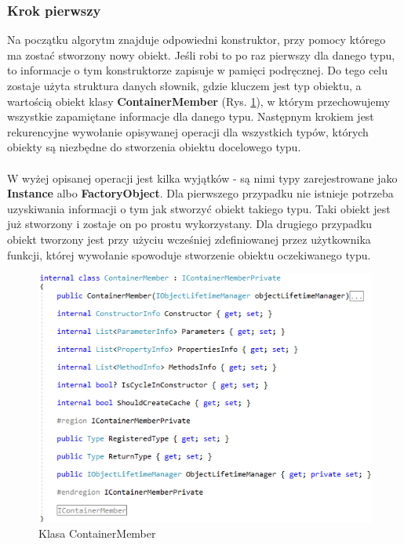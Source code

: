 \documentclass[12pt]{article}
\begin{document}
\subsubsection{Krok pierwszy}
Na początku algorytm znajduje odpowiedni konstruktor, przy pomocy którego ma zostać stworzony nowy obiekt. Jeśli robi to po raz pierwszy dla danego typu, to informacje o tym konstruktorze zapisuje w pamięci podręcznej. Do tego celu zostaje użyta struktura danych słownik, gdzie kluczem jest typ obiektu, a wartością obiekt klasy \textbf{ContainerMember} (Rys. \ref{fig:ContainerMember}), w którym przechowujemy wszystkie zapamiętane informacje dla danego typu. Następnym krokiem jest rekurencyjne wywołanie opisywanej operacji dla wszystkich typów, których obiekty są niezbędne do stworzenia obiektu docelowego typu.\\
\\
W wyżej opisanej operacji jest kilka wyjątków - są nimi typy zarejestrowane jako \textbf{Instance} albo \textbf{FactoryObject}. Dla pierwszego przypadku nie istnieje potrzeba uzyskiwania informacji o tym jak stworzyć obiekt takiego typu. Taki obiekt jest już stworzony i zostaje on po prostu wykorzystany. Dla drugiego przypadku obiekt tworzony jest przy użyciu wcześniej zdefiniowanej przez użytkownika funkcji, której wywołanie spowoduje stworzenie obiektu oczekiwanego typu.
\begin{figure}[H]
	\begin{center}
  		\includegraphics{ContainerMember.png}
  		\caption{Klasa ContainerMember}
  		\label{fig:ContainerMember}
	\end{center}
\end{figure}
\end{document}
